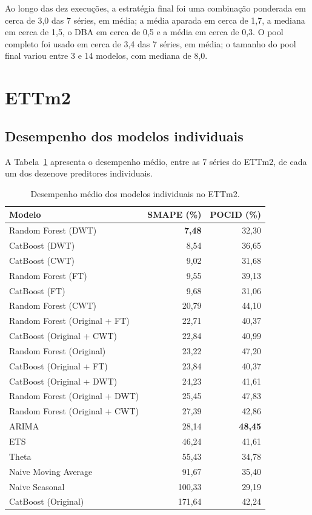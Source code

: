 Ao longo das dez execuções, a estratégia final foi uma combinação ponderada em cerca de 3,0 das 7 séries, em média; a média aparada em cerca de 1,7, a mediana em cerca de 1,5, o DBA em cerca de 0,5 e a média em cerca de 0,3. O pool completo foi usado em cerca de 3,4 das 7 séries, em média; o tamanho do pool final variou entre 3 e 14 modelos, com mediana de 8,0.
\section{ETTm2} \label{sec:resultados-ettm2}

\subsection{Desempenho dos modelos individuais}

A Tabela~\ref{tab:ettm2-individual} apresenta o desempenho médio, entre as 7 séries do ETTm2, de cada um dos dezenove preditores individuais.

\begin{table}[H]
\centering
\caption{Desempenho médio dos modelos individuais no ETTm2.}
\label{tab:ettm2-individual}
\begin{tabular}{@{}lrr@{}}
\toprule
\textbf{Modelo} & \textbf{SMAPE (\%)} & \textbf{POCID (\%)} \\
\midrule
Random Forest (DWT)                  & \textbf{7,48} & 32,30 \\
CatBoost (DWT)                       & 8,54 & 36,65 \\
CatBoost (CWT)                       & 9,02 & 31,68 \\
Random Forest (FT)                   & 9,55 & 39,13 \\
CatBoost (FT)                        & 9,68 & 31,06 \\
Random Forest (CWT)                  & 20,79 & 44,10 \\
Random Forest (Original + FT)        & 22,71 & 40,37 \\
CatBoost (Original + CWT)            & 22,84 & 40,99 \\
Random Forest (Original)             & 23,22 & 47,20 \\
CatBoost (Original + FT)             & 23,84 & 40,37 \\
CatBoost (Original + DWT)            & 24,23 & 41,61 \\
Random Forest (Original + DWT)       & 25,45 & 47,83 \\
Random Forest (Original + CWT)       & 27,39 & 42,86 \\
ARIMA                                & 28,14 & \textbf{48,45} \\
ETS                                  & 46,24 & 41,61 \\
Theta                                & 55,43 & 34,78 \\
Naive Moving Average                 & 91,67 & 35,40 \\
Naive Seasonal                       & 100,33 & 29,19 \\
CatBoost (Original)                  & 171,64 & 42,24 \\
\bottomrule
\end{tabular}
\end{table}


